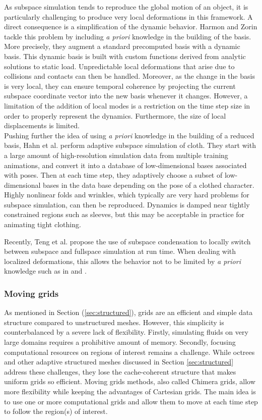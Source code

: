 As subspace simulation tends to reproduce the global motion of an object, it is particularly challenging to produce very local deformations in this framework. A direct consequence is a simplification of the dynamic behavior. Harmon and Zorin \cite{Harmon2013} tackle this problem by including \textit{a priori} knowledge in the building of the basis. More precisely, they augment a standard precomputed basis with a dynamic basis. This dynamic basis is built with custom functions derived from analytic solutions to static load. Unpredictable local deformations that arise due to collisions and contacts can then be handled. Moreover, as the change in the basis is very local, they can ensure temporal coherence by projecting the current subspace coordinate vector into the new basis whenever it changes. However, a limitation of the addition of local modes is a restriction on the time step size in order to properly represent the dynamics. Furthermore, the size of local displacements is limited.
\\
Pushing further the idea of using \textit{a priori} knowledge in the building of a reduced basis, Hahn et al. \cite{Hahn2014} perform adaptive subspace simulation of cloth. They start with a large amount of high-resolution simulation data from multiple training animations, and convert it into a database of low-dimensional bases associated with poses. Then at each time step, they adaptively choose a subset of low-dimensional bases in the data base depending on the pose of a clothed character.
Highly nonlinear folds and wrinkles, which typically are very hard problems for subspace simulation, can then be reproduced. Dynamics is damped near tightly constrained regions such as sleeves, but this may be acceptable in practice for animating tight clothing.

Recently, Teng et al. \cite{Teng2015} propose the use of subspace condensation to locally switch between subspace and fullspace simulation at run time. When dealing with localized deformations, this allows the behavior not to be limited by \textit{a priori} knowledge such as in \cite{Harmon2013} and \cite{Hahn2014}.

\subsubsection{Moving grids}
\label{sec:movingMesh}
As mentioned in Section (\ref{sec:structured}), grids are an efficient and simple data structure compared to unstructured meshes. However, this simplicity is counterbalanced by a severe lack of flexibility. Firstly, simulating fluids on very large domains requires a prohibitive amount of memory. Secondly, focusing computational resources on regions of interest remains a challenge.
While octrees and other adaptive structured meshes discussed in Section \ref{sec:structured} address these challenges, they lose the cache-coherent structure that makes uniform grids so efficient.
Moving grids methods, also called Chimera grids, allow more flexibility while keeping the advantages of Cartesian grids. The main idea is to use one or more computational grids and allow them to move at each time step to follow the region(s) of interest.

